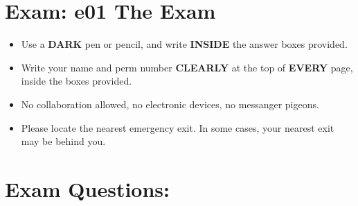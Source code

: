 \documentclass[twoside]{article}
\begin{document}
\section*{Exam: e01 The Exam}
\begin{itemize}
    \item Use a \textbf{DARK} pen or pencil, 
          and write \textbf{INSIDE} the answer boxes provided. 
    \item Write your name and perm number \textbf{CLEARLY} at the 
          top of \textbf{EVERY} page, inside the boxes provided.
    \item No collaboration allowed, no electronic devices, no messanger pigeons.
    \item Please locate the nearest emergency exit. In some cases, your nearest exit may be behind you.      
\end{itemize}

\section*{Exam Questions:}
\begin{enumerate}

\par\bigskip


\par\bigskip


\clearpage

\par\bigskip


\end{enumerate}
\end{document}
